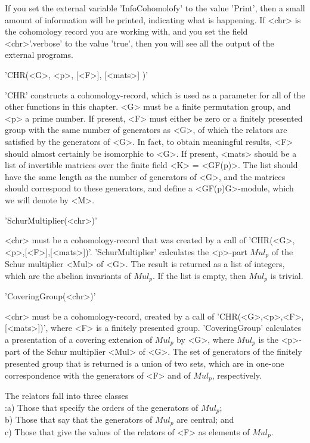 If you set the external variable 'InfoCohomolofy' to the value 'Print',
then a small amount of information will be printed, indicating what is
happening. If <chr> is the cohomology record you are working with, and
you set the field <chr>'.verbose' to the value 'true', then you will
see all the output of the external programs.

'CHR(<G>, <p>, [<F>], [<mats>] )'

'CHR'  constructs  a  cohomology-record, which is used as a parameter for
all of the other functions in this chapter. <G> must be  a finite
permutation group, and <p> a prime number. If present, <F> must either be
zero or a finitely presented group with the same number of generators as
<G>, of which the relators are satisfied by the generators of <G>.
In fact, to obtain meaningful results, <F> should almost certainly be
isomorphic to <G>. If present, <mats> should be a list of invertible matrices
over the finite field <K> = <GF(p)>. The list should have the same length as the
number of generators of <G>, and the matrices should correspond to these
generators, and define a <GF(p)G>-module, which we will denote by <M>.

'SchurMultiplier(<chr>)'

<chr> must be a cohomology-record that was created by a call of
'CHR(<G>,<p>,[<F>],[<mats>])'. 'SchurMultiplier' calculates
the <p>-part $Mul_p$ of the Schur multiplier <Mul> of <G>.
The result is returned as a list of integers, which are the
abelian invariants of $Mul_p$. If the list is empty, then
$Mul_p$ is trivial.

'CoveringGroup(<chr>)'

<chr> must be a cohomology-record, created by a call of
'CHR(<G>,<p>,<F>,[<mats>])', where <F> is a finitely presented group.
'CoveringGroup' calculates a presentation of a covering extension of $Mul_p$
by <G>, where $Mul_p$ is the <p>-part of the Schur multiplier <Mul> of <G>.
The set of generators of the finitely presented group that is returned
is a union of two sets, which are in one-one correspondence with the
generators of <F> and of $Mul_p$, respectively. 

The relators fall into three classes\:\\
:a) Those that specify the orders of the generators of $Mul_p$;\\
b) Those that say that the generators of $Mul_p$ are central; and\\
c) Those that give the values of the relators of <F> as elements of $Mul_p$.

